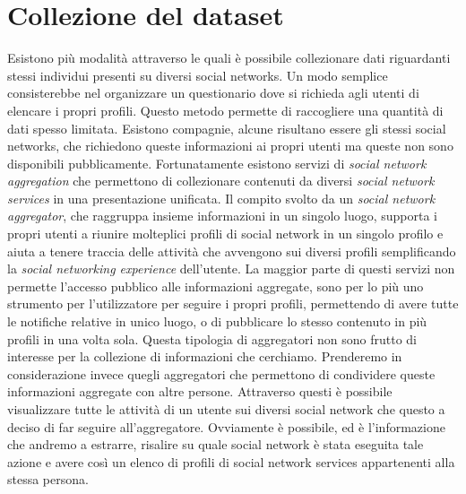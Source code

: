 \chapter{Collezione del dataset}
\label{cap3}

Esistono più modalità attraverso le quali è possibile collezionare dati riguardanti stessi individui presenti su diversi social networks. Un modo semplice consisterebbe nel organizzare un questionario dove si richieda agli utenti di elencare i propri profili. Questo metodo permette di raccogliere una quantità di dati spesso limitata. Esistono compagnie, alcune risultano essere gli stessi social networks, che richiedono queste informazioni ai propri utenti ma queste non sono disponibili pubblicamente.
Fortunatamente esistono servizi di \textit{social network aggregation} che permettono di collezionare contenuti da diversi \textit{social network services} in una presentazione unificata. Il compito svolto da un \textit{social network aggregator}, che raggruppa insieme informazioni in un singolo luogo, supporta i propri utenti a riunire molteplici profili di social network in un singolo profilo e aiuta a tenere traccia delle attività che avvengono sui diversi profili semplificando la \textit{social networking experience} dell'utente.
La maggior parte di questi servizi non permette l'accesso pubblico alle informazioni aggregate, sono per lo più uno strumento per l'utilizzatore per seguire i propri profili, permettendo di avere tutte le notifiche relative in unico luogo, o di pubblicare lo stesso contenuto in più profili in una volta sola. Questa tipologia di aggregatori non sono frutto di interesse per la collezione di informazioni che cerchiamo.
Prenderemo in considerazione invece quegli aggregatori che permettono di condividere queste informazioni aggregate con altre persone. Attraverso questi è possibile visualizzare tutte le attività di un utente sui diversi social network che questo a deciso di far seguire all'aggregatore. Ovviamente è possibile, ed è l'informazione che andremo a estrarre, risalire su quale social network è stata eseguita tale azione e avere così un elenco di profili di social network services appartenenti alla stessa persona.
